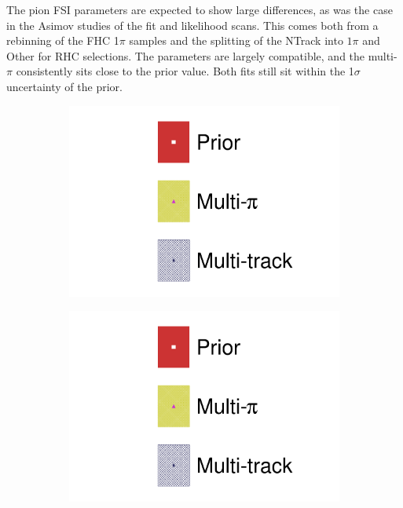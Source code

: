 The pion FSI parameters are expected to show large differences, as was the case in the Asimov studies of the fit and likelihood scans. This comes both from a rebinning of the FHC 1$\pi$ samples and the splitting of the NTrack into $1\pi$ and Other for RHC selections. The parameters are largely compatible, and the multi-$\pi$ consistently sits close to the prior value. Both fits still sit within the 1$\sigma$ uncertainty of the prior.
\begin{figure}[h]
	\centering
	\begin{subfigure}[t]{0.1\textwidth}
		\includegraphics[width=\textwidth,page=1, trim={0mm 130mm 40mm 0mm}, clip]{figures/mach3/2018/data/2018a_FixedCov_RedCov_Mpi_Data_merg_2018a_NewDetMatrix_OrderSwitched_Data2to8_ActualData_merge}
	\end{subfigure}
	\begin{subfigure}[t]{0.1\textwidth}
		\includegraphics[width=\textwidth,page=1, trim={0mm 65mm 40mm 70mm}, clip]{figures/mach3/2018/data/2018a_FixedCov_RedCov_Mpi_Data_merg_2018a_NewDetMatrix_OrderSwitched_Data2to8_ActualData_merge}

\end{subfigure}
\end{figure}
